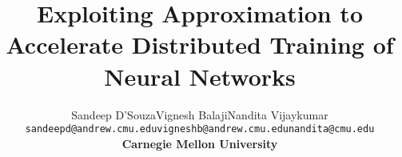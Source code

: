 \documentclass[pageno]{jpaper}
\begin{document}
\title{Exploiting Approximation to Accelerate Distributed Training of Neural Networks}

\DeclareRobustCommand{\authorthing}{
\begin{tabular}[t]{ccc}
Sandeep D'Souza & Vignesh Balaji & Nandita Vijaykumar \\
\texttt{sandeepd@andrew.cmu.edu} & \texttt{vigneshb@andrew.cmu.edu} & \texttt{nandita@cmu.edu}\\
\multicolumn{3}{c}{\textbf{Carnegie Mellon University}}
\end{tabular}
}
\author{\authorthing}

\date{}
\maketitle
\let\oldtabular\tabular
\renewcommand{\tabular}{\footnotesize\oldtabular}

\thispagestyle{empty}













\end{document}
